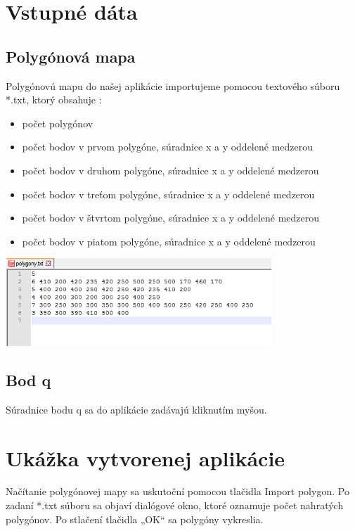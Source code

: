 \documentclass[12pt]{article}
\begin{document}
\section{Vstupné dáta}
\subsection{Polygónová mapa}
Polygónovú mapu do našej aplikácie importujeme pomocou textového súboru *.txt, ktorý obsahuje :

\begin{itemize}
\itemsep0em
\item počet polygónov
\item počet bodov v prvom polygóne, súradnice x a y oddelené medzerou
\item počet bodov v druhom polygóne, súradnice x a y oddelené medzerou
\item počet bodov v treťom polygóne, súradnice x a y oddelené medzerou
\item počet bodov v štvrtom polygóne, súradnice x a y oddelené medzerou
\item počet bodov v piatom polygóne, súradnice x a y oddelené medzerou
\end{itemize}

\begin{center}
   \includegraphics[width=10cm]{./img/txt_subor.png}
\end{center}

\subsection{Bod q}
Súradnice bodu q sa do aplikácie zadávajú kliknutím myšou.

\section{Ukážka vytvorenej aplikácie}
Načítanie polygónovej mapy sa uskutoční pomocou tlačidla Import polygon. Po zadaní *.txt súboru sa objaví dialógové okno, ktoré oznamuje počet nahratých polygónov. Po stlačení tlačidla „OK“ sa polygóny vykreslia.
\end{document}

